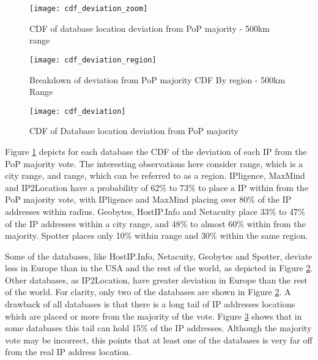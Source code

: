 \begin{figure}
\begin{minipage}[b]{\linewidth}
\centering
\texttt{[image: cdf\_deviation\_zoom]}
\caption{CDF of database location deviation from PoP majority -
500km range} \label{fig:cdf_deviation_zoom}
\end{minipage}
\end{figure}

\begin{figure}
\begin{minipage}[b]{\linewidth}
\centering
\texttt{[image: cdf\_deviation\_region]}
\caption{Breakdown of deviation from PoP majority CDF By region -
500km Range} \label{fig:cdf_deviation_region}
\end{minipage}
\end{figure}



\begin{figure}
\begin{minipage}[b]{\linewidth}
\centering
\texttt{[image: cdf\_deviation]}
\caption{CDF of Database location deviation from PoP majority}
\label{fig:cdf_deviation}
\end{minipage}
\end{figure}


Figure \ref{fig:cdf_deviation_zoom} depicts for each database the
CDF of the deviation of each IP from the PoP majority vote. The
interesting observations here consider  range, which is a city
range, and  range, which can be referred to as a region.
IPligence, MaxMind and IP2Location have a probability of 62\% to
73\% to place a IP within  from the PoP majority vote, with
IPligence and MaxMind placing over 80\% of the IP addresses within
 radius. Geobytes, HostIP.Info and Netacuity place 33\% to
47\% of the IP addresses within a city range, and 48\% to almost
60\% within  from the majority. Spotter places only 10\%
within  range and 30\% within the same region.

Some of the databases, like HostIP.Info, Netacuity, Geobytes and
Spotter, deviate less in Europe than in the USA and the rest of the
world, as depicted in Figure \ref{fig:cdf_deviation_region}. Other
databases, as IP2Location, have greater deviation in Europe than the
rest of the world. For clarity, only two of the databases are shown
in Figure \ref{fig:cdf_deviation_region}. A drawback of all
databases is that there is a long tail of IP addresses locations
which are placed  or more from the majority of the vote.
Figure \ref{fig:cdf_deviation} shows that in some databases this
tail can hold 15\% of the IP addresses. Although the majority vote
may be incorrect, this points that at least one of the databases is
very far off from the real IP address location.

